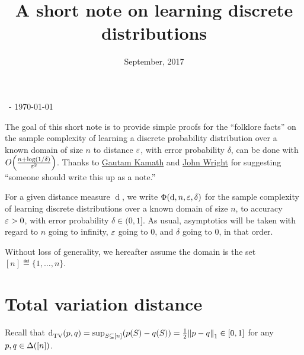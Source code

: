 \documentclass[10pt]{article}
\title{A short note on learning discrete distributions}
\date{September, 2017}
\begin{document}
\begin{flushleft}\sf\footnotesize
\makeatletter
\@date~- \today \hfill \@title
\makeatother
\end{flushleft}
\vspace{5mm}

The goal of this short note is to provide simple proofs for the ``folklore facts'' on the sample complexity of learning a discrete probability distribution over a known domain of size $n$ to distance $\varepsilon$, with error probability $\delta$, can be done with $\bigO{\frac{n+\log(1/\delta)}{\eps^2}}$. Thanks to \href{http://www.gautamkamath.com/}{Gautam Kamath} and \href{http://www.cs.cmu.edu/~jswright/}{John Wright} for suggesting ``someone should write this up as a note.''\bigskip

For a given distance measure $\operatorname{d}$, we write $\Phi(\operatorname{d},n,\varepsilon,\delta)$ for the sample complexity of learning discrete distributions over a known domain of size $n$, to accuracy $\varepsilon>0$, with error probability $\delta\in(0,1]$. As usual, asymptotics will be taken with regard to $n$ going to infinity, $\varepsilon$ going to $0$, and $\delta$ going to $0$, in that order.

\noindent Without loss of generality, we hereafter assume the domain is the set $[n]\eqdef \{1,\dots,n\}$.
\section{Total variation distance}

Recall that ${\operatorname{d}_{\rm TV}^{}\!\left({p, q}\right)} = \sup_{S\subseteq [n]} (p(S)-q(S)) = \frac{1}{2}{\lVert p-q{\rVert}}_1\in[0,1]$ for any $p,q\in\Delta\!\left([n]\right)$. 
\end{document}
